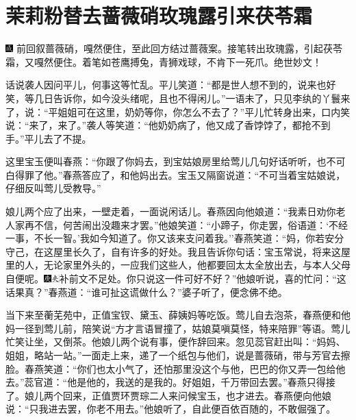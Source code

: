 

\chapter{茉莉粉替去蔷薇硝\hspace{.5em}玫瑰露引来茯苓霜}

{\includegraphics[width=3mm]{../Images/00005}  \kaishu 前回叙蔷薇硝，嘎然便住，至此回方结过蔷薇案。接笔转出玫瑰露，引起茯苓霜，又嘎然便住。着笔如苍鹰搏兔，青狮戏球，不肯下一死爪。绝世妙文！}

话说袭人因问平儿，何事这等忙乱。平儿笑道：``都是世人想不到的，说来也好笑，等几日告诉你，如今没头绪呢，且也不得闲儿。''一语未了，只见李纨的丫鬟来了，说：``平姐姐可在这里，奶奶等你，你怎么不去了？''平儿忙转身出来，口内笑说：``来了，来了。''袭人等笑道：``他奶奶病了，他又成了香饽饽了，都抢不到手。''平儿去了不提。

这里宝玉便叫春燕：``你跟了你妈去，到宝姑娘房里给莺儿几句好话听听，也不可白得罪了他。''春燕答应了，和他妈出去。宝玉又隔窗说道：``不可当着宝姑娘说，仔细反叫莺儿受教导。''

娘儿两个应了出来，一壁走着，一面说闲话儿。春燕因向他娘道：``我素日劝你老人家再不信，何苦闹出没趣来才罢。''他娘笑道：``小蹄子，你走罢，俗语道：`不经一事，不长一智。'我如今知道了。你又该来支问着我。''春燕笑道：``妈，你若安分守己，在这屋里长久了，自有许多的好处。我且告诉你句话：宝玉常说，将来这屋里的人，无论家里外头的，一应我们这些人，他都要回太太全放出去，与本人父母自便呢。{\includegraphics[width=3mm]{../Images/00004}\includegraphics[width=3mm]{../Images/00012}\footnotesize \kaishu 补前文不足处。}你只说这一件可好不好？''他娘听说，喜的忙问：``这话果真？''春燕道：``谁可扯这谎做什么？''婆子听了，便念佛不绝。

当下来至蘅芜苑中，正值宝钗、黛玉、薛姨妈等吃饭。莺儿自去泡茶，春燕便和他妈一径到莺儿前，陪笑说``方才言语冒撞了，姑娘莫嗔莫怪，特来陪罪''等语。莺儿忙笑让坐，又倒茶。他娘儿两个说有事，便作辞回来。忽见蕊官赶出叫：``妈妈、姐姐，略站一站。''一面走上来，递了一个纸包与他们，说是蔷薇硝，带与芳官去擦脸。春燕笑道：``你们也太小气了，还怕那里没这个与他，巴巴的你又弄一包给他去。''蕊官道：``他是他的，我送的是我的。好姐姐，千万带回去罢。''春燕只得接了。娘儿两个回来，正值贾环贾琮二人来问候宝玉，也才进去。春燕便向他娘说：``只我进去罢，你老不用去。''他娘听了，自此便百依百随的，不敢倔强了。


